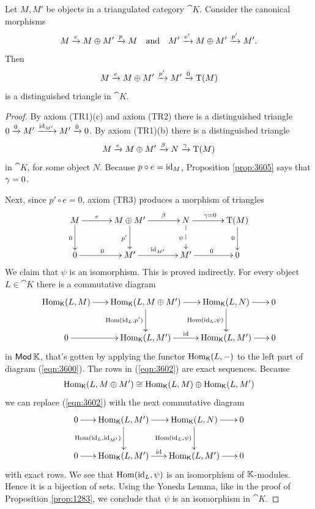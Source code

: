 \begin{lem} \label{lem:3600}
Let $M, M'$ be objects in a triangulated category $\cat{K}$.
Consider the canonical morphisms 
\[ M  \xrightarrow{e} M \oplus M' \xrightarrow{p} M \quad \textup{and} \quad
M'  \xrightarrow{e'} M \oplus M' \xrightarrow{p'} M' . \]
Then 
\[ M \xrightarrow{e} M \oplus M' \xrightarrow{p'} M' \xrightarrow{0} \operatorname{T}(M) \]
is a distinguished triangle in $\cat{K}$.
\end{lem}

\begin{proof}
By axiom (TR1)(c) and axiom (TR2) there is a distinguished triangle 
$0 \xrightarrow{0} M' \xrightarrow{\operatorname{id}_{M'}} M' \xrightarrow{0} 0$.
By axiom (TR1)(b) there is a distinguished triangle
\begin{equation} \label{eqn:4160}
 M \xrightarrow{e} M \oplus M' \xrightarrow{\beta} N \xrightarrow{\gamma} \operatorname{T}(M) 
\end{equation}
in $\cat{K}$, for some object $N$. 
Because $p \circ e = \operatorname{id}_M$, Proposition \ref{prop:3605} 
says that $\gamma = 0$. 

Next, since $p' \circ e = 0$, axiom (TR3) produces a morphism of triangles 
\begin{equation} \label{eqn:3600}
\UseTips  \xymatrix @C=8ex @R=6ex { 
M 
\ar[r]^(0.4){e}
\ar[d]_{0}
&
M \oplus M'
\ar[r]^(0.6){\be}
\ar[d]_{p'}
& 
N 
\ar[r]^(0.47){\ga = 0}
\ar@{-->}[d]_{\psi}
&
\opn{T}(M)
\ar[d]_{0}
\\
0
\ar[r]^{0}
&
M'
\ar[r]^{\opn{id}_{M'}}
&
M'
\ar[r]^{0}
& 
0
} 
\end{equation}
We claim that $\psi$ is an isomorphism. This is proved 
indirectly. For every object $L \in \cat{K}$ there is a commutative diagram 
\begin{equation} \label{eqn:3602}
\UseTips  \xymatrix @C=4ex @R=6ex { 
\opn{Hom}_{\cat{K}}(L, M)
\ar[r]
&
\opn{Hom}_{\cat{K}}(L, M \oplus M')
\ar[r]
\ar[d]_{\opn{Hom}(\opn{id}_L, p')}
& 
\opn{Hom}_{\cat{K}}(L, N)
\ar[r]
\ar[d]_{\opn{Hom}(\opn{id}_L, \psi)}
&
0
\\
0
\ar[r]
&
\opn{Hom}_{\cat{K}}(L, M')
\ar[r]^{\opn{id}}
& 
\opn{Hom}_{\cat{K}}(L, M')
\ar[r]
&
0
}
\end{equation}
in $\operatorname{\mathsf{Mod}} \mathbb{K}$, that's gotten by applying the functor 
$\operatorname{Hom}_{\operatorname{\mathsf{K}}}(L,- )$ to the left part of diagram (\ref{eqn:3600}).
The rows in (\ref{eqn:3602}) are exact sequences. 
Because 
\[ \operatorname{Hom}_{\operatorname{\mathsf{K}}}(L, M \oplus M') \cong 
\operatorname{Hom}_{\operatorname{\mathsf{K}}}(L, M) \oplus \operatorname{Hom}_{\operatorname{\mathsf{K}}}(L, M') \]
we can replace (\ref{eqn:3602}) with the next commutative diagram
\begin{equation} \label{eqn:4161}
\UseTips  \xymatrix @C=4ex @R=6ex { 
0
\ar[r]
&
\opn{Hom}_{\cat{K}}(L, M')
\ar[r]
\ar[d]_{\opn{Hom}(\opn{id}_L, \opn{id}_{M'})}
& 
\opn{Hom}_{\cat{K}}(L, N)
\ar[r]
\ar[d]_{\opn{Hom}(\opn{id}_L, \psi)}
&
0
\\
0
\ar[r]
&
\opn{Hom}_{\cat{K}}(L, M')
\ar[r]^{\opn{id}}
& 
\opn{Hom}_{\cat{K}}(L, M')
\ar[r]
&
0
}
\end{equation}
with exact rows. We see that 
$\operatorname{Hom}(\operatorname{id}_L, \psi)$ is an isomorphism of $\mathbb{K}$-modules. Hence it is a  
bijection of sets. Using the Yoneda Lemma, like in the proof of Proposition 
\ref{prop:1283}, we conclude that $\psi$ is an isomorphism in $\cat{K}$. 


\end{proof}
